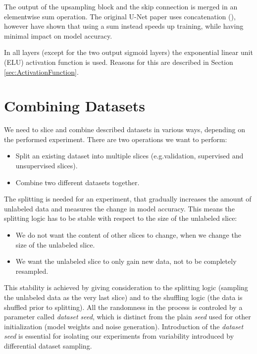 The output of the upsampling block and the skip connection is merged in an elementwise sum operation. The original U-Net paper uses concatenation (\cite{UNet}), however \cite{DorferEtAl} have shown that using a sum instead speeds up training, while having minimal impact on model accuracy.

In all layers (except for the two output sigmoid layers) the exponential linear unit (ELU) activation function is used. Reasons for this are described in Section \ref{sec:ActivationFunction}.


\section{Combining Datasets}

We need to slice and combine described datasets in various ways, depending on the performed experiment. There are two operations we want to perform:

\begin{itemize}
    \item Split an existing dataset into multiple slices (e.g.\@ validation, supervised and unsupervised slices).
    \item Combine two different datasets together.
\end{itemize}

The splitting is needed for an experiment, that gradually increases the amount of unlabeled data and measures the change in model accuracy. This means the splitting logic has to be stable with respect to the size of the unlabeled slice:

\begin{itemize}
    \item We do not want the content of other slices to change, when we change the size of the unlabeled slice.
    \item We want the unlabeled slice to only gain new data, not to be completely resampled.
\end{itemize}

This stability is achieved by giving consideration to the splitting logic (sampling the unlabeled data as the very last slice) and to the shuffling logic (the data is shuffled prior to splitting). All the randomness in the process is controled by a parameter called \emph{dataset seed}, which is distinct from the plain \emph{seed} used for other initialization (model weights and noise generation). Introduction of the \emph{dataset seed} is essential for isolating our experiments from variability introduced by differential dataset sampling.

